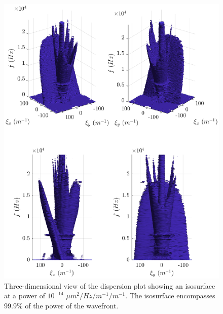 \begin{figure}
  \centering
  \includegraphics{../matlab/04_dispersion_analysis/dispersion_3d.eps}
  \caption{Three-dimensional view of the dispersion plot showing an isosurface at a power of $10^{-14}$ $\mu m^2/Hz/m^{-1}/m^{-1}$. The isosurface encompasses 99.9\% of the power of the wavefront.}
  \label{fig:04_dispersion_3d}
\end{figure}

